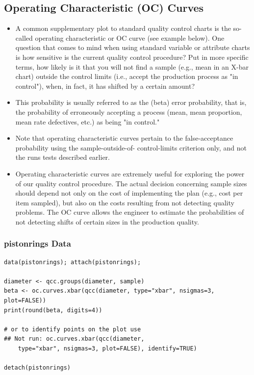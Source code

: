 
\subsection{Operating Characteristic (OC) Curves}
\begin{itemize}
\item A common supplementary plot to standard quality control charts is the so-called operating characteristic or OC curve (see example below). One question that comes to mind when using standard variable or attribute charts is how sensitive is the current quality control procedure? Put in more specific terms, how likely is it that you will not find a sample (e.g., mean in an X-bar chart) outside the control limits (i.e., accept the production process as "in control"), when, in fact, it has shifted by a certain amount? 

\item This probability is usually referred to as the  (beta) error probability, that is, the probability of erroneously accepting a process (mean, mean proportion, mean rate defectives, etc.) as being "in control." 

\item Note that operating characteristic curves pertain to the false-acceptance probability using the sample-outside-of- control-limits criterion only, and not the runs tests described earlier.


\item Operating characteristic curves are extremely useful for exploring the power of our quality control procedure. The actual decision concerning sample sizes should depend not only on the cost of implementing the plan (e.g., cost per item sampled), but also on the costs resulting from not detecting quality problems. The OC curve allows the engineer to estimate the probabilities of not detecting shifts of certain sizes in the production quality.
\end{itemize}






\newpage
\subsubsection{pistonrings Data}
\begin{framed}
\begin{verbatim}
data(pistonrings); attach(pistonrings);

diameter <- qcc.groups(diameter, sample)
beta <- oc.curves.xbar(qcc(diameter, type="xbar", nsigmas=3, plot=FALSE))
print(round(beta, digits=4))

# or to identify points on the plot use
## Not run: oc.curves.xbar(qcc(diameter, 
    type="xbar", nsigmas=3, plot=FALSE), identify=TRUE)

detach(pistonrings)
\end{verbatim}
\end{framed}


